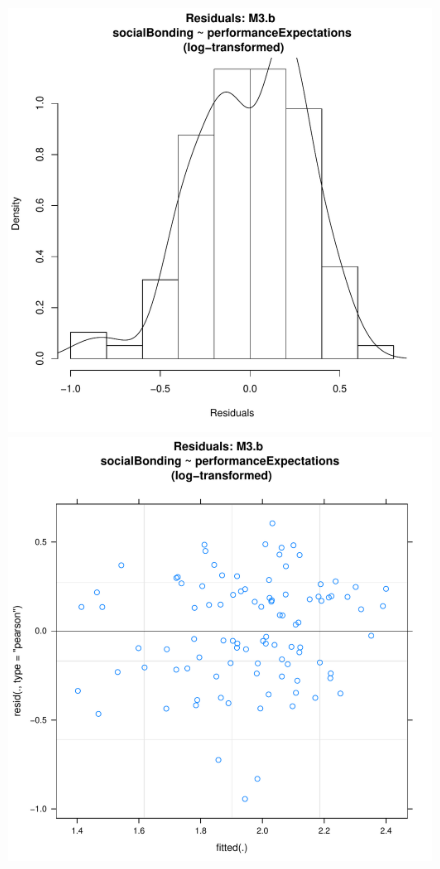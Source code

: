 \begin{CJK}{UTF8}{gbsn}
      \begin{figure}[!htbp]
        \includegraphics[scale =.4]{images/MLM3bLogHist.pdf}
        \includegraphics[scale =.4]{images/MLM3bLogScatter.pdf}

\end{figure}
\end{CJK}
